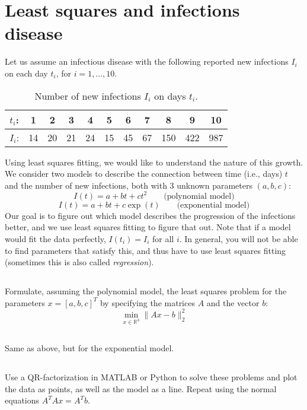 \documentclass{article}%
\begin{document}
\section{Least squares and infections disease}
Let us assume an infectious disease with the following reported new
infections $I_i$ on each day $t_i$, for $i=1,\ldots,10$.
\begin{table}[h]\centering
  \caption{Number of new infections $I_i$ on days $t_i$.}
  \begin{tabular}{c||c|c|c|c|c|c|c|c|c|c|}
\hline
$t_i$: & 1 & 2 & 3 & 4 & 5 & 6 & 7 & 8 & 9 & 10\\ \hline
$I_i$: & 14 & 20 & 21 & 24 & 15 & 45 & 67 & 150 & 422 & 987\\ \hline
\end{tabular}
\end{table}
Using least squares fitting, we would like to understand the nature of
this growth. We consider two models to describe the connection between
time (i.e., days) $t$ and the number of new infections, both with 3
unknown parameters $(a,b,c)$:
\begin{equation*}%
  I(t) = a + b t + c t^2 \qquad \text{(polynomial model)}
\end{equation*}
\begin{equation*}%
  I(t) = a + bt + c\exp(t) \qquad \text{(exponential model)}
\end{equation*}
Our goal is to figure out which model describes the progression of the
infections better, and we use least squares fitting to figure that
out. Note that if a model would fit the data perfectly, $I(t_i) = I_i$
for all $i$. In general, you will not be able to find parameters that
satisfy this, and thus have to use least squares fitting (sometimes
this is also called \emph{regression}).

\subsection{} Formulate, assuming the polynomial model, the least squares
  problem for the parameters $  x=[a,b,c]^T$ by specifying the
  matrices $A$ and the vector $  b$:
  $$ \min_{  x\in \mathbb R^3}\|  A  x -  
  b \|_2^2
  $$

\subsection{}  Same as above, but for the exponential model.

\subsection{} Use a QR-factorization in MATLAB or Python to solve these
  problems and plot the data as points, as well as the model as a
  line. Repeat using the normal equations $  A^T  A  x =
    A^T  b$.
\end{document}

